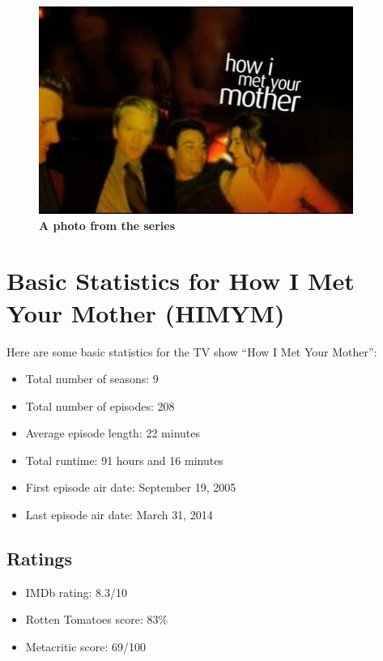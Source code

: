 \documentclass[
  letterpaper,
  DIV=11,
  numbers=noendperiod]{scrartcl}
\providecommand{\tightlist}{%
  \setlength{\itemsep}{0pt}\setlength{\parskip}{0pt}}\usepackage{longtable,booktabs,array}
\begin{document}
\begin{figure}

{\centering \includegraphics{Howimetyourmother.jpg}

}

\caption{\textbf{A photo from the series}}

\end{figure}

\hypertarget{basic-statistics-for-how-i-met-your-mother-himym}{%
\section{Basic Statistics for How I Met Your Mother
(HIMYM)}\label{basic-statistics-for-how-i-met-your-mother-himym}}

Here are some basic statistics for the TV show ``How I Met Your
Mother'':

\begin{itemize}
\tightlist
\item
  Total number of seasons: 9
\item
  Total number of episodes: 208
\item
  Average episode length: 22 minutes
\item
  Total runtime: 91 hours and 16 minutes
\item
  First episode air date: September 19, 2005
\item
  Last episode air date: March 31, 2014
\end{itemize}

\hypertarget{ratings}{%
\subsection{Ratings}\label{ratings}}

\begin{itemize}
\tightlist
\item
  IMDb rating: 8.3/10
\item
  Rotten Tomatoes score: 83\%
\item
  Metacritic score: 69/100
\end{itemize}
\end{document}
